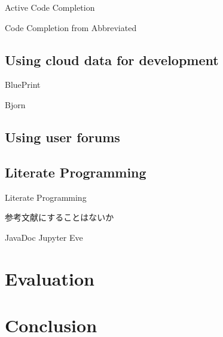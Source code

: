 \documentclass{sigchi}
\begin{document}
Active Code Completion\cite{Omar:2012:ACC:2337223.2337324}

Code Completion from Abbreviated\cite{Han:2009:CCA:1747491.1747530}

\subsection{Using cloud data for development}

BluePrint \cite{Brandt:2010:EPI:1753326.1753402}

Bjorn\cite{Hartmann:2010:OPS:1753326.1753478}

\subsection{Using user forums}


\subsection{Literate Programming}

Literate Programming\cite{Knuth}

参考文献にすることはないか

JavaDoc
Jupyter
Eve

\section{Evaluation}

\section{Conclusion}




\end{document}
